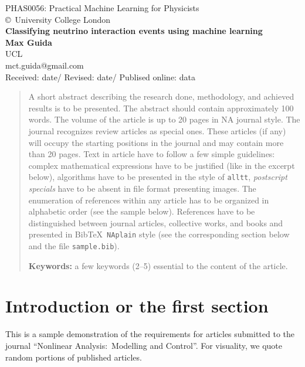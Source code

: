 \documentclass[a4paper, 10pt]{article}
\begin{document}
\begin{center}
PHAS0056: Practical Machine Learning for Physicists\\
\copyright\ University College London\\[24pt]
\LARGE
\textbf{Classifying neutrino interaction events using machine learning}\\[6pt]
\small
\textbf {Max Guida}\\[6pt]
UCL \\ mct.guida@gmail.com\\[6pt]
Received: date\quad/\quad
Revised: date\quad/\quad
Publised online: data
\end{center}

\begin{abstract}
A short abstract describing the research done, methodology, and achieved results is to be presented. The abstract should contain approximately 100 words. The volume of the article is up to 20 pages in NA journal style. The journal recognizes review articles as special ones. These articles (if any) will occupy the starting positions in the journal and may contain more than 20 pages. Text in article have to follow a few simple guidelines: complex mathematical expressions have to be justified (like in the excerpt below), algorithms have to be presented in the style of \texttt{alltt}, \textit{postscript specials} have to be absent in file format presenting images. The enumeration of references within any article has to be organized in alphabetic order (see the sample below). References have to be distinguished between journal articles, collective works, and books and presented in BibTeX\ \texttt{NAplain} style (see the corresponding section below and the file \texttt{sample.bib}). \vskip 2mm

\textbf{Keywords:} a few keywords (2--5) essential to the content of the article.

\end{abstract}

\nocite{2009ProcDETAp}

\section{Introduction or the first section}\label{s:1}
This is a sample demonstration of the requirements for articles submitted to the journal ``Nonlinear Analysis:\ Modelling and Control''. For visuality, we quote random portions of published articles.
\end{document}
